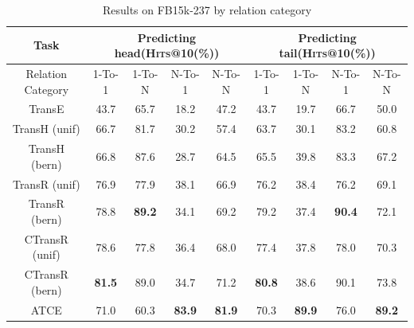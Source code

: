 \begin{table} %
  \centering
  \caption{Results on FB15k-237 by relation category}
  \label{FB15k-237_results_by_relation_category}
  \begin{tabular}{c|cccc|cccc}
    \hline
    Task               & \multicolumn{4}{c|}{Predicting head(\textsc{Hits}@10(\%))} & \multicolumn{4}{c}{Predicting tail(\textsc{Hits}@10(\%))} \\
    \hline
    Relation Category  & 1-To-1        & 1-To-N        & N-To-1        & N-To-N        & 1-To-1        & 1-To-N        & N-To-1        & N-To-N \\
    \hline
    TransE             & 43.7          & 65.7          & 18.2          & 47.2          & 43.7          & 19.7          & 66.7          & 50.0   \\
    TransH (unif)      & 66.7          & 81.7          & 30.2          & 57.4          & 63.7          & 30.1          & 83.2          & 60.8   \\
    TransH (bern)      & 66.8          & 87.6          & 28.7          & 64.5          & 65.5          & 39.8          & 83.3          & 67.2   \\
    TransR (unif)      & 76.9          & 77.9          & 38.1          & 66.9          & 76.2          & 38.4          & 76.2          & 69.1   \\
    TransR (bern)      & 78.8          & \textbf{89.2} & 34.1          & 69.2          & 79.2          & 37.4          & \textbf{90.4} & 72.1   \\
    CTransR (unif)     & 78.6          & 77.8          & 36.4          & 68.0          & 77.4          & 37.8          & 78.0          & 70.3   \\
    CTransR (bern)     & \textbf{81.5} & 89.0          & 34.7          & 71.2          & \textbf{80.8} & 38.6          & 90.1          & 73.8   \\
    \hline
    ATCE                & 71.0          & 60.3          & \textbf{83.9} & \textbf{81.9} & 70.3          & \textbf{89.9} & 76.0          & \textbf{89.2}   \\
    \hline
\end{tabular}
\end{table}
